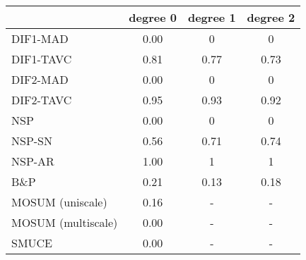\begin{tabular}{|l|c|c|c|}
  \hline
 & degree 0 & degree 1 & degree 2 \\ 
  \hline
DIF1-MAD & 0.00 & 0 & 0 \\ 
  DIF1-TAVC & 0.81 & 0.77 & 0.73 \\ 
  DIF2-MAD & 0.00 & 0 & 0 \\ 
  DIF2-TAVC & 0.95 & 0.93 & 0.92 \\ 
  NSP & 0.00 & 0 & 0 \\ 
  NSP-SN & 0.56 & 0.71 & 0.74 \\ 
  NSP-AR & 1.00 & 1 & 1 \\ 
  B\&P & 0.21 & 0.13 & 0.18 \\ 
  MOSUM (uniscale) & 0.16 & - & - \\ 
  MOSUM (multiscale) & 0.00 & - & - \\ 
  SMUCE & 0.00 & - & - \\ 
   \hline
\end{tabular}
